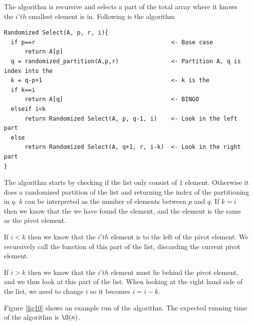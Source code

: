 \documentclass[10pt]{article}
\begin{document}
The algorithm is recursive and selects a part of the total array where it knows the $i'th$ smallest element is in. Following is the algorithm
\begin{verbatim}
Randomized Select(A, p, r, i){
  if p==r                                       <- Base case
      return A[p]
  q = randomized_partition(A,p,r)               <- Partition A, q is index into the 
  k = q-p+1                                     <- k is the 
  if k==i
      return A[q]                               <- BINGO
  elseif i<k
      return Randomized Select(A, p, q-1, i)    <- Look in the left part
  else   
      return Randomized Select(A, q+1, r, i-k)  <- Look in the right part
}  
\end{verbatim}
The algorithm starts by checking if the list only consist of $1$ element. Otherwise it does a randomized partition of the list and returning the index of the partitioning in $q$. $k$ can be interpreted as the number of elements between $p$ and $q$. If $k=i$ then we know that the we have found the element, and the element is the same as the pivot element.

If $i<k$ then we know that the $i'th$ element is to the left of the pivot element. We recursively call the function of this part of the list, discarding the current pivot element.

If $i>k$ then we know that the $i'th$ element must lie behind the pivot element, and we thus look at this part of the list. When looking at the right hand side of the list, we need to change $i$ so it becomes $i = i-k$.

Figure \ref{fig10} shows an example run of the algorithm. The expected running time of the algorithm is $\O(n)$.
\end{document}
